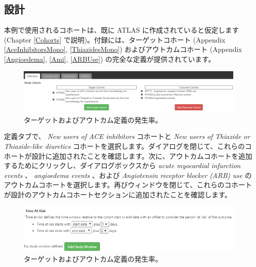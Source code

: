 \documentclass[
  11pt]{book}
\theoremstyle{definition}
\theoremstyle{definition}
\theoremstyle{definition}
\theoremstyle{definition}
\theoremstyle{remark}
\begin{document}
\subsection{設計}\label{ux8a2dux8a08-1}

本例で使用されるコホートは、既に ATLAS に作成されていると仮定します (Chapter \ref{Cohorts} で説明)。付録には、ターゲットコホート (Appendix \ref{AceInhibitorsMono}, \ref{ThiazidesMono}) およびアウトカムコホート (Appendix \ref{Angioedema}, \ref{Ami}, \ref{ARBUse}) の完全な定義が提供されています。

\begin{figure}

{\centering \includegraphics[width=1\linewidth]{images/Characterization/atlasIncidenceCohortSelection} 

}

\caption{ターゲットおよびアウトカム定義の発生率。}\label{fig:atlasIncidenceCohortSelection}
\end{figure}

定義タブで、 \emph{New users of ACE inhibitors} コホートと \emph{New users of Thiazide or Thiazide-like diuretics} コホートを選択します。ダイアログを閉じて、これらのコホートが設計に追加されたことを確認します。次に、アウトカムコホートを追加するためにクリックし、ダイアログボックスから \emph{acute myocardial infarction events} 、 \emph{angioedema events} 、および \emph{Angiotensin receptor blocker (ARB) use} のアウトカムコホートを選択します。再びウィンドウを閉じて、これらのコホートが設計のアウトカムコホートセクションに追加されたことを確認します。

\begin{figure}

{\centering \includegraphics[width=1\linewidth]{images/Characterization/atlasIncidenceTimeAtRisk} 

}

\caption{ターゲットおよびアウトカム定義の発生率。}\label{fig:atlasIncidenceTimeAtRisk}
\end{figure}
\end{document}
